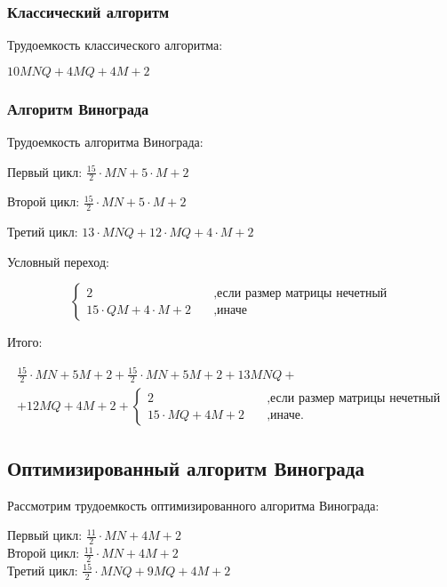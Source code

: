\subsubsection{Классический алгоритм}

Трудоемкость классического алгоритма:

$10MNQ + 4MQ + 4M + 2$

\subsubsection{Алгоритм Винограда}

Трудоемкость алгоритма Винограда:

Первый цикл: $\frac{15}{2} \cdot MN + 5 \cdot M + 2$

Второй цикл: $\frac{15}{2} \cdot MN + 5 \cdot M + 2$

Третий цикл: $13 \cdot MNQ + 12 \cdot MQ + 4 \cdot M + 2$

Условный переход:

\begin{equation*}
    \begin{cases}
        2 & \quad \text{,если размер матрицы нечетный} \\
        15 \cdot QM + 4 \cdot M + 2 & \quad \text{,иначе}
    \end{cases}
\end{equation*}

Итого:

\begin{multline*}
    \frac{15}{2} \cdot MN + 5 M + 2 + \frac{15}{2} \cdot MN + 5 M + 2 + 13 MNQ + \\
     + 12 MQ + 4M + 2 + \begin{cases}
        2 & \quad \text{,если размер матрицы нечетный} \\
        15 \cdot MQ + 4M + 2 & \quad \text{,иначе.}
    \end{cases}
\end{multline*}

\subsection{Оптимизированный алгоритм Винограда}

Рассмотрим трудоемкость оптимизированного алгоритма Винограда:

\noindent
Первый цикл: $\frac{11}{2} \cdot MN + 4M + 2$ \\
Второй цикл: $\frac{11}{2} \cdot MN + 4M + 2$ \\
Третий цикл: $\frac{15}{2} \cdot MNQ + 9MQ + 4M + 2$ \\

